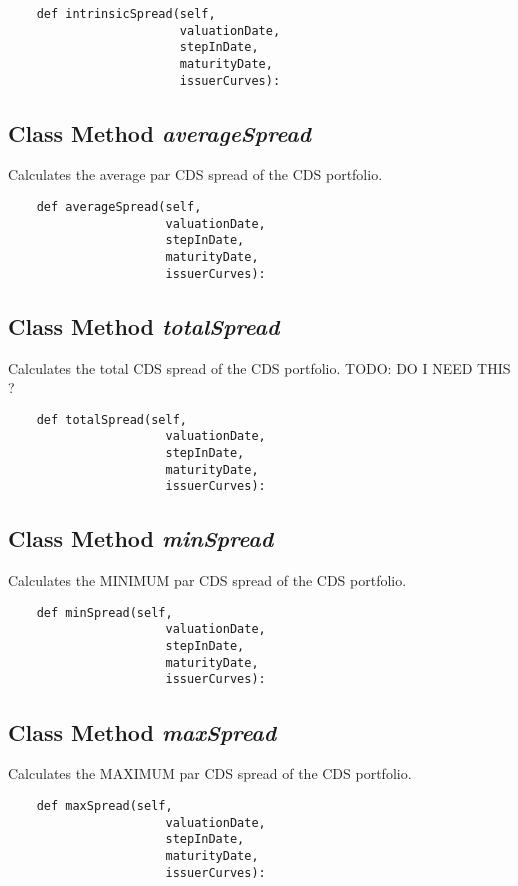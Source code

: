 \documentclass[twoside,11pt]{book}
\begin{document}
\begin{lstlisting}
    def intrinsicSpread(self, 
                        valuationDate,
                        stepInDate,
                        maturityDate,
                        issuerCurves):
\end{lstlisting}

\subsection{Class Method {\it averageSpread}}
Calculates the average par CDS spread of the CDS portfolio. 

\begin{lstlisting}
    def averageSpread(self, 
                      valuationDate,
                      stepInDate,
                      maturityDate,
                      issuerCurves):
\end{lstlisting}

\subsection{Class Method {\it totalSpread}}
Calculates the total CDS spread of the CDS portfolio. TODO: DO I NEED THIS ? 

\begin{lstlisting}
    def totalSpread(self, 
                      valuationDate,
                      stepInDate,
                      maturityDate,
                      issuerCurves):
\end{lstlisting}

\subsection{Class Method {\it minSpread}}
Calculates the MINIMUM par CDS spread of the CDS portfolio. 

\begin{lstlisting}
    def minSpread(self, 
                      valuationDate,
                      stepInDate,
                      maturityDate,
                      issuerCurves):
\end{lstlisting}

\subsection{Class Method {\it maxSpread}}
Calculates the MAXIMUM par CDS spread of the CDS portfolio. 

\begin{lstlisting}
    def maxSpread(self, 
                      valuationDate,
                      stepInDate,
                      maturityDate,
                      issuerCurves):
\end{lstlisting}
\end{document}
